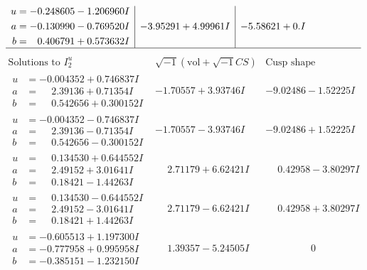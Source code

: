 \documentclass[1p]{elsarticle_modified}
\theoremstyle{definition}
\newcommand{\I}{\sqrt{-1}}
\begin{document}
$$\begin{array}{c|c|c}
\begin{aligned}
u &= -0.248605 - 1.206960 I \\
a &= -0.130990 - 0.769520 I \\
b &= \phantom{-}0.406791 + 0.573632 I\end{aligned}
 & -3.95291 + 4.99961 I & -5.58621 + 0. I\phantom{ +0.000000I}\\
 \hline 
 \end{array}$$\newpage$$\begin{array}{c|c|c}  
\text{Solutions to }I^u_{2}& \I (\text{vol} + \sqrt{-1}CS) & \text{Cusp shape}\\
 \hline 
\begin{aligned}
u &= -0.004352 + 0.746837 I \\
a &= \phantom{-}2.39136 + 0.71354 I \\
b &= \phantom{-}0.542656 + 0.300152 I\end{aligned}
 & -1.70557 + 3.93746 I & -9.02486 - 1.52225 I \\ \hline\begin{aligned}
u &= -0.004352 - 0.746837 I \\
a &= \phantom{-}2.39136 - 0.71354 I \\
b &= \phantom{-}0.542656 - 0.300152 I\end{aligned}
 & -1.70557 - 3.93746 I & -9.02486 + 1.52225 I \\ \hline\begin{aligned}
u &= \phantom{-}0.134530 + 0.644552 I \\
a &= \phantom{-}2.49152 + 3.01641 I \\
b &= \phantom{-}0.18421 - 1.44263 I\end{aligned}
 & \phantom{-}2.71179 + 6.62421 I & \phantom{-}0.42958 - 3.80297 I \\ \hline\begin{aligned}
u &= \phantom{-}0.134530 - 0.644552 I \\
a &= \phantom{-}2.49152 - 3.01641 I \\
b &= \phantom{-}0.18421 + 1.44263 I\end{aligned}
 & \phantom{-}2.71179 - 6.62421 I & \phantom{-}0.42958 + 3.80297 I \\ \hline\begin{aligned}
u &= -0.605513 + 1.197300 I \\
a &= -0.777958 + 0.995958 I \\
b &= -0.385151 - 1.232150 I\end{aligned}
 & \phantom{-}1.39357 - 5.24505 I & \phantom{-0.000000 } 0 \\ \hline\begin{aligned}

\end{aligned}
\end{array}$$
\end{document}
